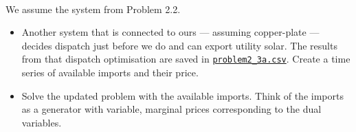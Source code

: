 \documentclass[10pt]{article}
\newenvironment{problem}[2][Problem]{\begin{trivlist}
\item[\hskip \labelsep {\bfseries #1}\hskip \labelsep {\bfseries #2.}]}{\end{trivlist}}
\begin{document}
\

\begin{problem}{2.3}
	
	We assume the system from Problem 2.2.
	\begin{itemize}
		\item[a)] Another system that is connected to ours --- assuming copper-plate --- decides dispatch just before we do and can export utility solar. The results from that dispatch optimisation are saved in \href{https://github.com/aleks-g/integrated-energy-grids/tree/main/integrated-energy-grids/Problems/data/problem2_3a.csv}{\texttt{problem2\_3a.csv}}. Create a time series of available imports and their price.
		\item[b)] Solve the updated problem with the available imports. Think of the imports as a generator with variable, marginal prices corresponding to the dual variables.
	\end{itemize}

\end{problem}

\

\end{document}
